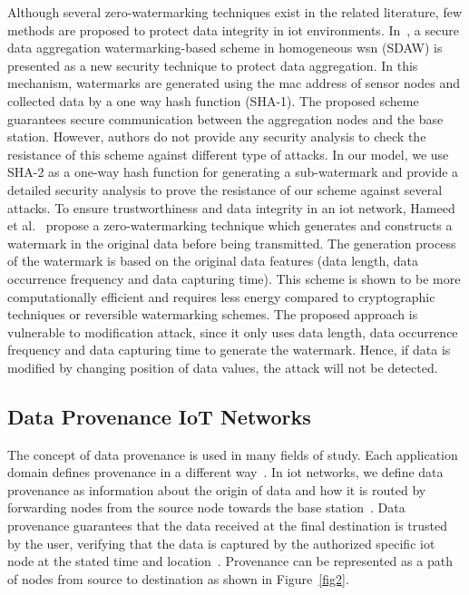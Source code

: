 \documentclass{llncs}
\begin{document}
Although several zero-watermarking techniques exist in the related literature, few methods are proposed to protect data integrity in \gls*{iot} environments. In~\cite{Boubiche2015}, a secure data aggregation watermarking-based scheme in homogeneous \gls*{wsn} (SDAW) is presented as a new security technique to protect data aggregation. In this mechanism, watermarks are generated using the \gls*{mac} address of sensor nodes and collected data by a one way hash function (SHA-1). The proposed scheme guarantees secure communication between the aggregation nodes and the base station. However, authors do not provide any security analysis to check the resistance of this scheme against different type of attacks. In our model, we use SHA-2 as a one-way hash function for generating a sub-watermark and provide a detailed security analysis to prove the resistance of our scheme against several attacks. To ensure trustworthiness and data integrity in an \gls*{iot} network, Hameed et al.~\cite{hameed2018} propose a zero-watermarking technique which generates and constructs a watermark in the original data before being transmitted. The generation process of the watermark is based on the original data features (data length, data occurrence frequency and data capturing time). This scheme is shown to be more computationally efficient and requires less energy compared to cryptographic techniques or reversible watermarking schemes. The proposed approach is vulnerable to modification attack, since it only uses data length, data occurrence frequency and data capturing time to generate the watermark. Hence, if data is modified by changing position of data values, the attack will not be detected. 

\subsection{Data Provenance IoT Networks}

The concept of data provenance is used in many fields of study. Each application domain defines provenance in a different way~\cite{Park2008}. In \gls*{iot} networks, we define data provenance as information about the origin of data and how it is routed by forwarding nodes from the source node towards the base station~\cite{Lim2010}. Data provenance guarantees that the data received at the final destination is trusted by the user, verifying that the data is captured by the authorized specific \gls*{iot} node at the stated time and location~\cite{Bertino2018}. Provenance can be represented as a path of nodes from source to destination as shown in Figure~\ref{fig2}. 
\end{document}
